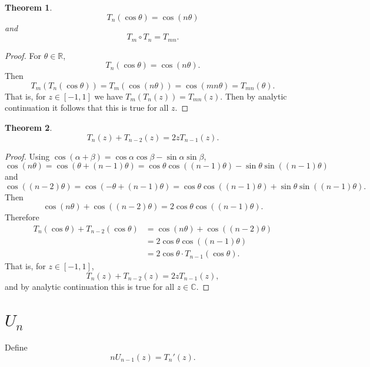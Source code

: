 \documentclass{article}
\newtheorem{theorem}{Theorem}
\theoremstyle{definition}
\begin{document}
\begin{theorem}
\[
T_n(\cos \theta) = \cos(n\theta)
\]
and
\[
T_m \circ T_n = T_{mn}.
\]
\label{Tncos}
\end{theorem}
\begin{proof}
For $\theta \in \mathbb{R}$,
\[
T_n(\cos \theta) = \cos(n\theta).
\]
Then
\[
T_m(T_n(\cos \theta)) = T_m( \cos (n\theta))
=\cos (mn\theta)
=T_{mn}(\theta).
\]
That is, for $z \in [-1,1]$ we have
$T_m(T_n(z)) = T_{mn}(z)$. Then by analytic continuation it follows that
this is true for all $z$.
\end{proof}

\begin{theorem}
\[
T_n(z)+T_{n-2}(z)=2zT_{n-1}(z).
\]
\end{theorem}
\begin{proof}
Using $\cos(\alpha+\beta)=\cos \alpha \cos \beta - \sin \alpha \sin \beta$, 
\[
\cos(n\theta) = \cos(\theta+(n-1)\theta)
=\cos \theta \cos((n-1)\theta)-\sin\theta\sin((n-1)\theta)
\]
and
\[
\cos((n-2)\theta) = \cos(-\theta+(n-1)\theta)
=\cos \theta \cos((n-1)\theta)+\sin\theta\sin((n-1)\theta).
\]
Then
\[
\cos(n\theta)+\cos((n-2)\theta)=2 \cos \theta \cos((n-1)\theta).
\]
Therefore
\begin{align*}
T_n(\cos \theta)+T_{n-2}(\cos\theta)&=\cos(n\theta)
+\cos((n-2)\theta)\\
&=2 \cos \theta \cos((n-1)\theta)\\
&=2 \cos \theta \cdot T_{n-1}(\cos\theta).
\end{align*}
That is, for $z \in [-1,1]$,
\[
T_n(z)+T_{n-2}(z)=2zT_{n-1}(z),
\]
and by analytic continuation this is true for all $z \in \mathbb{C}$.
\end{proof}



\section{$U_n$}
Define
\begin{equation}
nU_{n-1}(z) = T_n'(z).
\label{Un}
\end{equation}
\end{document}
